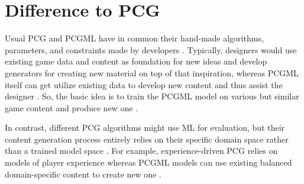 \documentclass[MGS,Master,english]{twbook}%
\begin{document}
\section{Difference to \acl{PCG}}
Usual \ac{PCG} and \ac{PCGML} have in common their hand-made algorithms, parameters, and constraints made by developers \cite{pcgml::paper}. Typically, designers would use existing game data and content as foundation for new ideas and develop generators for creating new material on top of that inspiration, whereas \ac{PCGML} itself can get utilize existing data to develop new content and thus assist the designer \cite{pcgml::paper}. So, the basic idea is to train the \ac{PCGML} model on various but similar game content and produce new one \cite{pcgml::paper}. 

In contrast, different \ac{PCG} algorithms might use \ac{ML} for evaluation, but their content generation process entirely relies on their specific domain space rather than a trained model space \cite{pcgml::paper}. For example, experience-driven \ac{PCG} relies on models of player experience whereas \ac{PCGML} models can use existing balanced domain-specific content to create new one \cite{pcgml::paper}.
\end{document}
